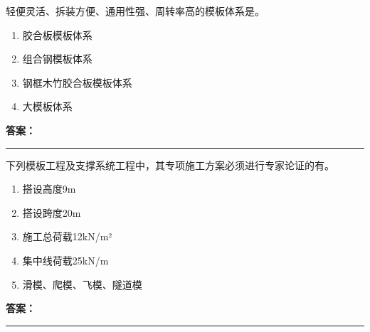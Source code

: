 \documentclass[UTF8,fontset=fandol,11pt]{ctexart}
\newcommand{\answerline}{\textcolor{answerred}{\rule{2.4cm}{0.7pt}}}
\begin{document}
\begin{quizbox}[title={乱序第 60 题｜第四章混凝土结构工程}]

轻便灵活、拆装方便、通用性强、周转率高的模板体系是。\\

\begin{enumerate}[label=\Alph*.]

\item 胶合板模板体系

\item 组合钢模板体系

\item 钢框木竹胶合板模板体系

\item 大模板体系

\end{enumerate}

\textbf{\textcolor{answerred}{答案：}} \answerline

\end{quizbox}

\vspace{0.2em}

\begin{quizbox}[title={乱序第 61 题｜第七章脚手架工程}]

下列模板工程及支撑系统工程中，其专项施工方案必须进行专家论证的有。\\

\begin{enumerate}[label=\Alph*.]

\item 搭设高度9m

\item 搭设跨度20m

\item 施工总荷载12kN/m²

\item 集中线荷载25kN/m

\item 滑模、爬模、飞模、隧道模

\end{enumerate}

\textbf{\textcolor{answerred}{答案：}} \answerline

\end{quizbox}

\vspace{0.2em}
\end{document}

